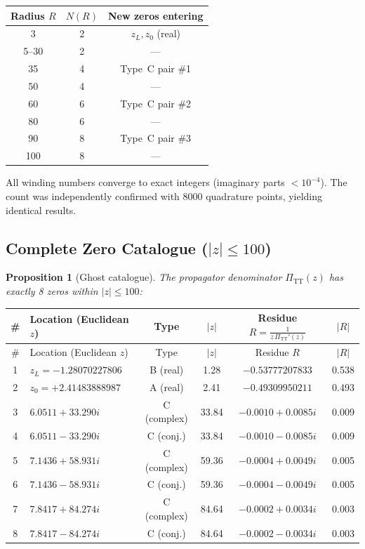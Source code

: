\documentclass[11pt,a4paper]{article}
\newcommand{\PiTT}{\Pi_{\mathrm{TT}}}
\newtheorem{proposition}[theorem]{Proposition}
\begin{document}
\begin{center}
\begin{tabular}{ccc}
\toprule
Radius $R$ & $N(R)$ & New zeros entering \\
\midrule
3          & 2      & $z_L, z_0$ (real) \\
5--30      & 2      & --- \\
35         & 4      & Type~C pair \#1 \\
50         & 4      & --- \\
60         & 6      & Type~C pair \#2 \\
80         & 6      & --- \\
90         & 8      & Type~C pair \#3 \\
100        & 8      & --- \\
\bottomrule
\end{tabular}
\end{center}

All winding numbers converge to exact integers (imaginary parts
$< 10^{-4}$).  The count was independently confirmed with 8000
quadrature points, yielding identical results.

\subsection{Complete Zero Catalogue ($|z| \leq 100$)}

\begin{proposition}[Ghost catalogue]
\label{prop:catalogue}
The propagator denominator $\PiTT(z)$ has exactly 8 zeros within
$|z| \leq 100$:
\end{proposition}

{\small
\begin{longtable}{clcccc}
\toprule
\# & Location (Euclidean $z$) & Type & $|z|$ &
  Residue $R = \frac{1}{z\,\PiTT'(z)}$ & $|R|$ \\
\midrule
\endfirsthead
\toprule
\# & Location (Euclidean $z$) & Type & $|z|$ &
  Residue $R$ & $|R|$ \\
\midrule
\endhead
1 & $z_L = -1.28070227806$ & B (real) & 1.28 &
  $-0.53777207833$ & 0.538 \\
2 & $z_0 = +2.41483888987$ & A (real) & 2.41 &
  $-0.49309950211$ & 0.493 \\
3 & $6.0511 + 33.290i$ & C (complex) & 33.84 &
  $-0.0010 + 0.0085i$ & 0.009 \\
4 & $6.0511 - 33.290i$ & C (conj.) & 33.84 &
  $-0.0010 - 0.0085i$ & 0.009 \\
5 & $7.1436 + 58.931i$ & C (complex) & 59.36 &
  $-0.0004 + 0.0049i$ & 0.005 \\
6 & $7.1436 - 58.931i$ & C (conj.) & 59.36 &
  $-0.0004 - 0.0049i$ & 0.005 \\
7 & $7.8417 + 84.274i$ & C (complex) & 84.64 &
  $-0.0002 + 0.0034i$ & 0.003 \\
8 & $7.8417 - 84.274i$ & C (conj.) & 84.64 &
  $-0.0002 - 0.0034i$ & 0.003 \\
\bottomrule
\end{longtable}
}
\end{document}
